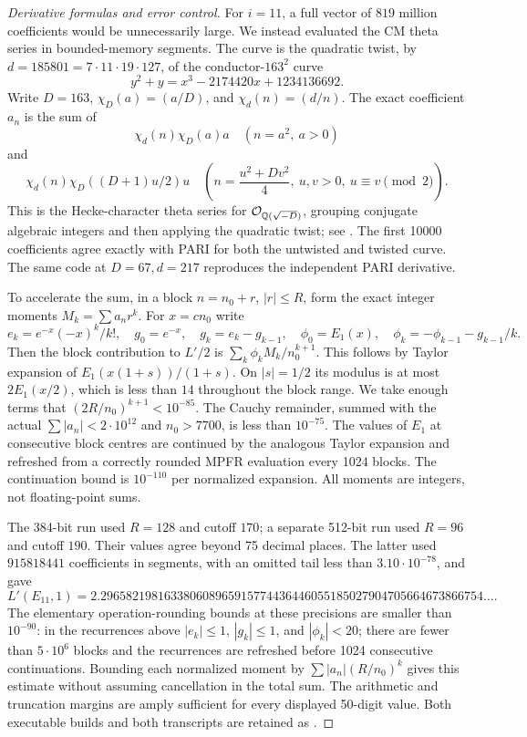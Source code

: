 \begin{proof}[Derivative formulas and error control]
For $i=11$, a full vector of $819$ million coefficients would be
unnecessarily large. We instead evaluated the CM theta series in
bounded-memory segments. The curve is the quadratic twist, by
$d=185801=7\cdot11\cdot19\cdot127$, of the conductor-$163^2$
curve
\[
 y^2+y=x^3-2174420x+1234136692.
\]
Write $D=163$, $\chi_D(a)=(a/D)$, and $\chi_d(n)=(d/n)$.
The exact coefficient $a_n$ is the sum of
\[
 \chi_d(n)\chi_D(a)a \quad(n=a^2,\ a>0)
\]
and
\[
 \chi_d(n)\chi_D((D+1)u/2)u
 \quad\left(n=\frac{u^2+Dv^2}{4},\ u,v>0,
                           \ u\equiv v\pmod2\right).
\]
This is the Hecke-character theta series for
$\mathcal O_{\mathbb Q(\sqrt{-D})}$, grouping conjugate algebraic integers
and then applying the quadratic twist; see
\citet[Section 3]{CrDarmon2009}. The first 10000 coefficients agree
exactly with PARI for both the untwisted and twisted curve. The same
code at $D=67,d=217$ reproduces the independent PARI derivative.

To accelerate the sum, in a block $n=n_0+r$, $|r|\leq R$, form the
exact integer moments $M_k=\sum a_nr^k$. For $x=cn_0$ write
\[
 e_k=e^{-x}(-x)^k/k!,\quad g_0=e^{-x},\quad
 g_k=e_k-g_{k-1},\quad
 \phi_0=E_1(x),\quad\phi_k=-\phi_{k-1}-g_{k-1}/k.
\]
Then the block contribution to $L'/2$ is
$\sum_k\phi_k M_k/n_0^{k+1}$. This follows by Taylor expansion
of $E_1(x(1+s))/(1+s)$. On $|s|=1/2$ its modulus is at most
$2E_1(x/2)$, which is less than $14$ throughout the block range.
We take enough terms that $(2R/n_0)^{k+1}<10^{-85}$.
The Cauchy remainder, summed with the actual
$\sum|a_n|<2\cdot10^{12}$ and $n_0>7700$, is less than
$10^{-75}$. The values of $E_1$ at consecutive block centres
are continued by the analogous Taylor expansion and refreshed
from a correctly rounded MPFR evaluation every 1024 blocks.
The continuation bound is $10^{-110}$ per normalized expansion.
All moments are integers, not floating-point sums.

The 384-bit run used $R=128$ and cutoff $170$; a separate 512-bit
run used $R=96$ and cutoff $190$. Their values agree beyond 75
decimal places. The latter used $915818441$ coefficients in
segments, with an omitted tail less than $3.10\cdot10^{-78}$,
and gave
\[
 L'(E_{11},1)=
 2.296582198163380608965915774436446055185027904705664673866754\ldots.
\]
The elementary operation-rounding bounds at these precisions are
smaller than $10^{-90}$: in the recurrences above
$|e_k|\leq1$, $|g_k|\leq1$, and $|\phi_k|<20$;
there are fewer than $5\cdot10^6$ blocks and the recurrences are
refreshed before 1024 consecutive continuations. Bounding each
normalized moment by $\sum|a_n|(R/n_0)^k$ gives this estimate
without assuming cancellation in the total sum. The arithmetic
and truncation margins are amply sufficient for every displayed
50-digit value. Both executable builds and both transcripts are
retained as .


\end{proof}
